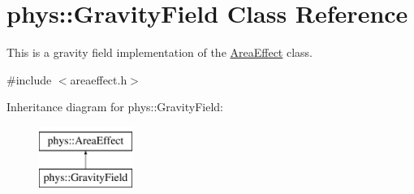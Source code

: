 \hypertarget{classphys_1_1GravityField}{
\section{phys::GravityField Class Reference}
\label{d4/d8a/classphys_1_1GravityField}
}


This is a gravity field implementation of the \hyperlink{classphys_1_1AreaEffect}{AreaEffect} class.  




{\ttfamily \#include $<$areaeffect.h$>$}

Inheritance diagram for phys::GravityField:\begin{figure}[H]
\begin{center}
\leavevmode
\includegraphics[height=2cm]{d4/d8a/classphys_1_1GravityField}
\end{center}
\end{figure}
